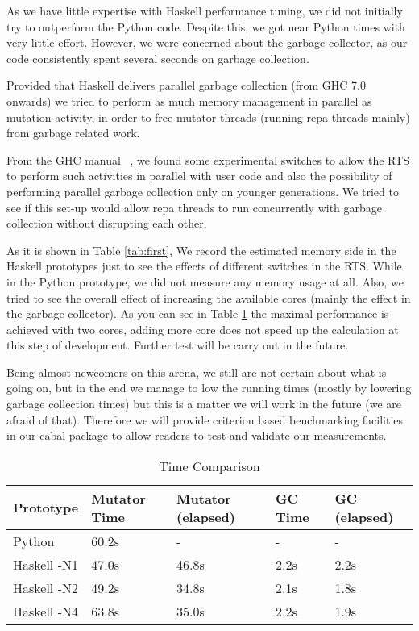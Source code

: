 \documentclass{tmr}
\begin{document}
As we have little expertise with Haskell performance tuning, we did not initially try to outperform the Python
code.  Despite this, we got near Python times with very little effort.
However, we were concerned about the garbage collector, as our code
consistently spent several seconds on garbage collection.


Provided that Haskell
delivers parallel garbage collection (from GHC 7.0 onwards) we tried to perform as much memory management in parallel
as mutation activity, in order to free mutator threads (running repa threads mainly) from garbage related work.

From the GHC manual ~\cite{ghc}, we found some experimental switches to allow the RTS to perform such activities in parallel
with user code and also the possibility of performing parallel garbage collection only on younger generations.
We tried to see if this set-up would allow repa threads to run concurrently with garbage collection without  
disrupting each other.

As it is shown in Table \ref{tab:first}, We record the estimated memory side in the 
Haskell prototypes just to see the effects of different switches in the RTS. While in the Python
prototype, we did not measure any memory usage at all. Also, we tried to see the overall effect of 
increasing the available cores (mainly the effect in the garbage collector). As you can see in Table
\ref{tab:second} the maximal performance is achieved with two cores, adding more core does not speed up
the calculation at this step of development. Further test will be carry out in the future.

Being almost newcomers on this arena, we still are not certain about what is going on,
but in the end we manage to low the running times (mostly by lowering garbage collection times)
but this is a matter we will work in the future (we are afraid of that). Therefore we will
provide criterion based benchmarking facilities in our cabal package to allow 
readers to test and validate our measurements.

\begin{table}[float,captionpos=b,belowcaptionskip=4pt]
\begin{center}
    \begin{tabular}{ l l l l l }
Prototype  & Mutator Time & Mutator (elapsed) & GC Time & GC (elapsed) \\ 
\hline Python   & 60.2s   & -      & -    & - \\
Haskell -N1 & 47.0s   & 46.8s  & 2.2s & 2.2s \\
Haskell -N2  & 49.2s   & 34.8s  & 2.1s & 1.8s \\
Haskell -N4  & 63.8s   & 35.0s  & 2.2s & 1.9s  \\

    \end{tabular} 
\end{center}
\label{tab:second}
\caption{Time Comparison}
\end{table}
\end{document}
